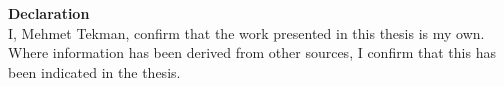 \pagebreak
{\noindent \bf Declaration}\\
{\noindent I, Mehmet Tekman, confirm that the work presented in this thesis is my own. Where information has been derived from other sources, I confirm that this has been indicated in the thesis.}
\pagebreak
